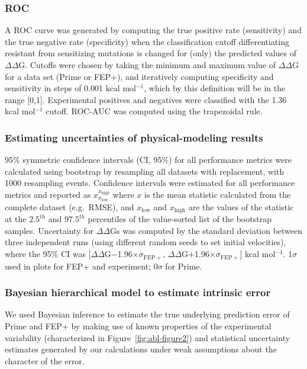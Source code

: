 \documentclass[phd,tocprelim]{cornell}
\begin{document}
\subsubsection{ROC}
A ROC curve was generated by computing the true positive rate (sensitivity) and the true negative rate (specificity) when the classification cutoff differentiating resistant from sensitizing mutations is changed for (only) the predicted values of $\Delta\Delta$G. Cutoffs were chosen by taking the minimum and maximum value of $\Delta\Delta$G for a data set (Prime or FEP+), and iteratively computing specificity and sensitivity in steps of 0.001 kcal mol$^{-1}$, which by this definition will be in the range [0,1]. Experimental positives and negatives were classified with the 1.36 kcal mol$^{-1}$ cutoff. ROC-AUC was computed using the trapezoidal rule.

\subsubsection{Estimating uncertainties of physical-modeling results}
95\% symmetric confidence intervals (CI, 95\%) for all performance metrics were calculated using bootstrap by resampling all datasets with replacement, with 1000 resampling events.
Confidence intervals were estimated for all performance metrics and reported as $x_{x_\mathrm{low}}^{x_\mathrm{high}}$ where $x$ is the mean statistic calculated from the complete dataset (e.g.~RMSE), and $x_\mathrm{low}$ and $x_\mathrm{high}$ are the values of the statistic at the $2.5^{th}$ and $97.5^{th}$ percentiles of the value-sorted list of the bootstrap samples.
Uncertainty for $\Delta\Delta$Gs was computed by the standard deviation between three independent runs (using different random seeds to set initial velocities), where the 95\% CI was [$\Delta\Delta$G$-$1.96$\times \sigma _\mathrm{FEP+}$, $\Delta\Delta$G$+$1.96$\times \sigma _\mathrm{FEP+}$] kcal mol$^{-1}$.
1$\sigma$ used in plots for FEP+ and experiment; 0$\sigma$ for Prime.

\subsubsection{Bayesian hierarchical model to estimate intrinsic error}
We used Bayesian inference to estimate the true underlying prediction error of Prime and FEP+ by making use of known properties of the experimental variability (characterized in Figure~\ref{fig:abl-figure2}) and statistical uncertainty estimates generated by our calculations under weak assumptions about the character of the error.
\end{document}
